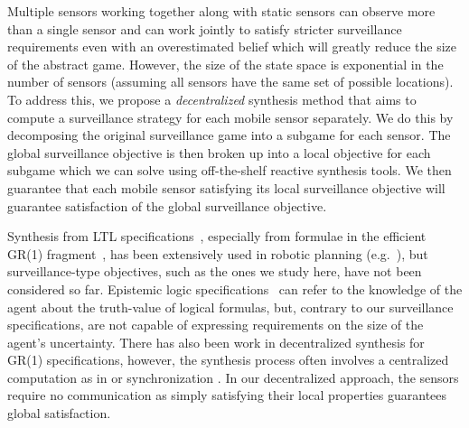 Multiple sensors working together along with static sensors can observe more than a single sensor and can work jointly to satisfy stricter surveillance requirements even with an overestimated belief which will greatly reduce the size of the abstract game. However, the size of the state space is exponential in the number of sensors (assuming all sensors have the same set of possible locations). To address this, we propose a \emph{decentralized} synthesis method that aims to compute a surveillance strategy for each mobile sensor separately. We do this by decomposing the original surveillance game into a subgame for each sensor. The global surveillance objective is then broken up into a local objective for each subgame which we can solve using off-the-shelf reactive synthesis tools. We then guarantee that each mobile sensor satisfying its local surveillance objective will guarantee satisfaction of the global surveillance objective.

Synthesis from LTL specifications~\cite{Pnueli1989}, especially from formulae in the efficient GR(1) fragment~\cite{Piterman2006}, has been extensively used in robotic planning (e.g.~\cite{wong2012,Kress2007}), but surveillance-type objectives, such as the ones we study here, have not been considered so far. Epistemic logic specifications~\cite{MeydenV98} can refer to the knowledge of the agent about the truth-value of logical formulas, but, contrary to our surveillance specifications, are not capable of expressing requirements on the size of the agent's uncertainty. There has also been work in decentralized synthesis for GR(1) specifications, however, the synthesis process often involves a centralized computation as in \cite{Kloetzer06} or synchronization \cite{Salar17,Kloetzer11}. In our decentralized approach, the sensors require no communication as simply satisfying their local properties guarantees global satisfaction.



